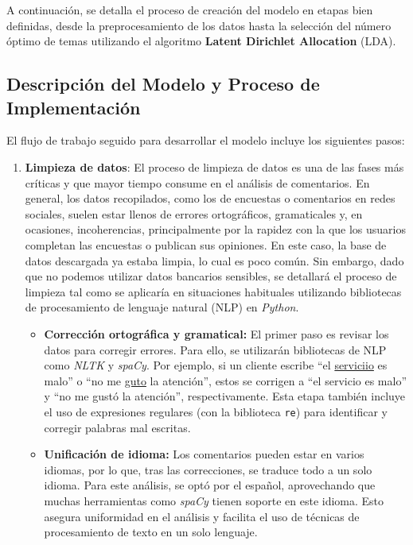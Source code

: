\documentclass{matematicasud}
\begin{document}
A continuación, se detalla el proceso de creación del modelo en etapas bien definidas, desde la preprocesamiento de los datos hasta la selección del número óptimo de temas utilizando el algoritmo \textbf{Latent Dirichlet Allocation} (LDA).

\subsection{Descripción del Modelo y Proceso de Implementación}

El flujo de trabajo seguido para desarrollar el modelo incluye los siguientes pasos:

\begin{enumerate}
    \item \textbf{Limpieza de datos}: El proceso de limpieza de datos es una de las fases más críticas y que mayor tiempo consume en el análisis de comentarios. En general, los datos recopilados, como los de encuestas o comentarios en redes sociales, suelen estar llenos de errores ortográficos, gramaticales y, en ocasiones, incoherencias, principalmente por la rapidez con la que los usuarios completan las encuestas o publican sus opiniones. En este caso, la base de datos descargada ya estaba limpia, lo cual es poco común. Sin embargo, dado que no podemos utilizar datos bancarios sensibles, se detallará el proceso de limpieza tal como se aplicaría en situaciones habituales utilizando bibliotecas de procesamiento de lenguaje natural (NLP) en \textit{Python}.
    
    \begin{itemize}
        \item \textbf{Corrección ortográfica y gramatical:} El primer paso es revisar los datos para corregir errores. Para ello, se utilizarán bibliotecas de NLP como \textit{NLTK} y \textit{spaCy}. Por ejemplo, si un cliente escribe ``el \underline{serviciio} es malo'' o ``no me \underline{guto} la atención'', estos se corrigen a ``el servicio es malo'' y ``no me gustó la atención'', respectivamente. Esta etapa también incluye el uso de expresiones regulares (con la biblioteca \texttt{re}) para identificar y corregir palabras mal escritas.
        
        \item \textbf{Unificación de idioma:} Los comentarios pueden estar en varios idiomas, por lo que, tras las correcciones, se traduce todo a un solo idioma. Para este análisis, se optó por el español, aprovechando que muchas herramientas como \textit{spaCy} tienen soporte en este idioma. Esto asegura uniformidad en el análisis y facilita el uso de técnicas de procesamiento de texto en un solo lenguaje.
        

\end{itemize}
\end{enumerate}
\end{document}
